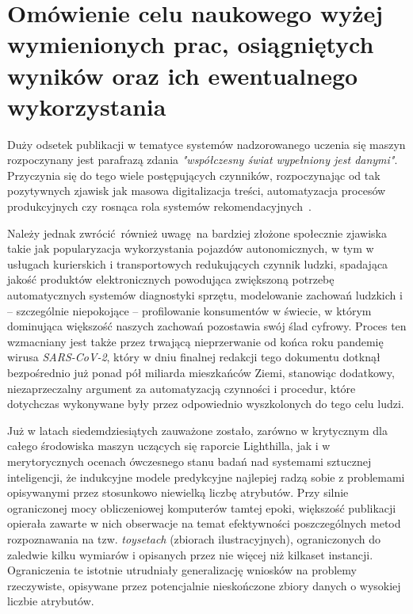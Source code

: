 \newpage
\section{Omówienie celu naukowego wyżej wymienionych prac, osiągniętych wyników oraz ich ewentualnego wykorzystania}\vspace{-1em}
Duży odsetek publikacji w tematyce systemów nadzorowanego uczenia się maszyn rozpoczynany jest parafrazą zdania \emph{"współczesny świat wypełniony jest danymi"}. Przyczynia się do tego wiele postępujących czynników, rozpoczynając od tak pozytywnych zjawisk jak masowa digitalizacja treści, automatyzacja procesów produkcyjnych czy rosnąca rola  systemów rekomendacyjnych~. 

Należy jednak zwrócić również uwagę na bardziej złożone społecznie zjawiska takie jak popularyzacja wykorzystania pojazdów autonomicznych, w tym w usługach kurierskich i transportowych redukujących czynnik ludzki, spadająca jakość produktów elektronicznych powodująca zwiększoną potrzebę automatycznych systemów diagnostyki sprzętu, modelowanie zachowań ludzkich i -- szczególnie niepokojące -- profilowanie konsumentów w świecie, w którym dominująca większość naszych zachowań pozostawia swój ślad cyfrowy. Proces ten wzmacniany jest także przez trwającą nieprzerwanie od końca  roku pandemię wirusa \emph{SARS-CoV-2}, który w dniu finalnej redakcji tego dokumentu dotknął bezpośrednio już ponad pół miliarda mieszkańców Ziemi, stanowiąc dodatkowy, niezaprzeczalny argument za automatyzacją czynności i procedur, które dotychczas wykonywane były przez odpowiednio wyszkolonych do tego celu ludzi.

Już w latach siedemdziesiątych zauważone zostało, zarówno w krytycznym dla całego środowiska maszyn uczących się raporcie Lighthilla, jak i w merytorycznych ocenach ówczesnego stanu badań nad systemami sztucznej inteligencji, że indukcyjne modele predykcyjne najlepiej radzą sobie z problemami opisywanymi przez stosunkowo niewielką liczbę atrybutów. Przy silnie ograniczonej mocy obliczeniowej komputerów tamtej epoki, większość publikacji opierała zawarte w nich obserwacje na temat efektywności poszczególnych metod rozpoznawania na tzw. \emph{toysetach} (zbiorach ilustracyjnych), ograniczonych do zaledwie kilku wymiarów i opisanych przez nie więcej niż kilkaset instancji. Ograniczenia te istotnie utrudniały generalizację wniosków na problemy rzeczywiste, opisywane przez potencjalnie nieskończone zbiory danych o wysokiej liczbie atrybutów.

